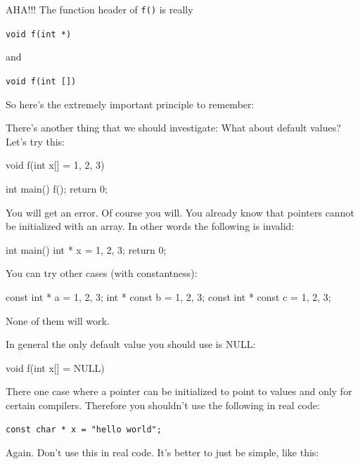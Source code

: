AHA!!! The function header of \texttt{f()} is really

\verb!void f(int *)!

and 

\verb!void f(int [])!

So here's the extremely important principle to remember:
\begin{center}
\end{center}

\newpage{}

There's another thing that we should investigate: What about default values? Let's try this:

\begin{consolethree}[escapeinside=||]
void f(int x[] = {1, 2, 3})
{}

int main()
{
    f();
    return 0;
}
\end{consolethree}

You will get an error. Of course you will. You already know that pointers cannot be initialized with an array. In other words the following is invalid:

\begin{consolethree}[escapeinside=||]
int main()
{
    int * x = {1, 2, 3};
    return 0;
}
\end{consolethree}

You can try other cases (with constantness):

\begin{consolethree}[escapeinside=||]
const int * a = {1, 2, 3};
int * const b = {1, 2, 3};
const int * const c = {1, 2, 3};
\end{consolethree}

None of them will work.

In general the only default value you should use is NULL:

\begin{consolethree}[escapeinside=||]
void f(int x[] = NULL)
{}
\end{consolethree}

There  one case where a pointer can be initialized to point to values and only for certain compilers. Therefore you shouldn't use the following in real code:

\verb!const char * x = "hello world";!

Again. Don't use this in real code. It's better to just be simple, like this:

